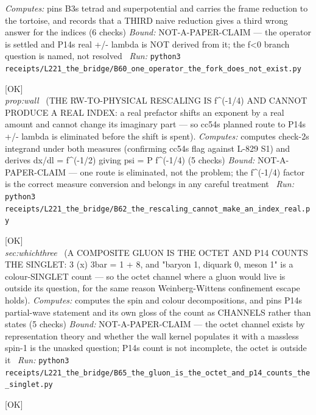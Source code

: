 \begin{description}
\emph{Computes:} pins B3s tetrad and superpotential and carries the frame reduction to the tortoise, and records that a THIRD naive reduction gives a third wrong answer for the indices (6 checks)
 \emph{Bound:} NOT-A-PAPER-CLAIM --- the operator is settled and P14s real +/- lambda is NOT derived from it; the f<0 branch question is named, not resolved
\ \emph{Run:} \texttt{python3 receipts/L221\_the\_bridge/B60\_one\_operator\_the\_fork\_does\_not\_exist.py}
\item[\label{rcpt:B62_the_rescaling_cannot_make_an_index_real}\textbf{}\quad\texttt{B62\_the\_rescaling\_cannot\_make\_an\_index\_real}]\hfill\textsf{[OK]}\\
\textit{prop:wall} \ (THE RW-TO-PHYSICAL RESCALING IS f\textasciicircum{}(-1/4) AND CANNOT PRODUCE A REAL INDEX: a real prefactor shifts an exponent by a real amount and cannot change its imaginary part --- so cc54s planned route to P14s +/- lambda is eliminated before the shift is spent). 
\emph{Computes:} computes check-2s integrand under both measures (confirming cc54s flag against L-829 S1) and derives dx/dl = f\textasciicircum{}(-1/2) giving psi = P f\textasciicircum{}(-1/4) (5 checks)
 \emph{Bound:} NOT-A-PAPER-CLAIM --- one route is eliminated, not the problem; the f\textasciicircum{}(-1/4) factor is the correct measure conversion and belongs in any careful treatment
\ \emph{Run:} \texttt{python3 receipts/L221\_the\_bridge/B62\_the\_rescaling\_cannot\_make\_an\_index\_real.py}
\item[\label{rcpt:B65_the_gluon_is_the_octet_and_p14_counts_the_singlet}\textbf{}\quad\texttt{B65\_the\_gluon\_is\_the\_octet\_and\_p14\_counts\_the\_singlet}]\hfill\textsf{[OK]}\\
\textit{sec:whichthree} \ (A COMPOSITE GLUON IS THE OCTET AND P14 COUNTS THE SINGLET: 3 (x) 3bar = 1 + 8, and "baryon 1, diquark 0, meson 1" is a colour-SINGLET count --- so the octet channel where a gluon would live is outside its question, for the same reason Weinberg-Wittens confinement escape holds). 
\emph{Computes:} computes the spin and colour decompositions, and pins P14s partial-wave statement and its own gloss of the count as CHANNELS rather than states (5 checks)
 \emph{Bound:} NOT-A-PAPER-CLAIM --- the octet channel exists by representation theory and whether the wall kernel populates it with a massless spin-1 is the unasked question; P14s count is not incomplete, the octet is outside it
\ \emph{Run:} \texttt{python3 receipts/L221\_the\_bridge/B65\_the\_gluon\_is\_the\_octet\_and\_p14\_counts\_the\_singlet.py}
\item[\label{rcpt:B67_verdict_the_analytic_sqrt_f_operator}\textbf{}\quad\texttt{B67\_verdict\_the\_analytic\_sqrt\_f\_operator}]\hfill\textsf{[OK]}\\

\end{description}
